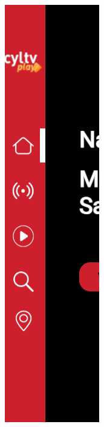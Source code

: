 \begin{figure}[H]
    \centering
    \begin{subfigure}[c]{0.1\textwidth} 
        \includegraphics[width=\textwidth]{imaxes/OTT/menu_lateral_cerrado.png}

\end{subfigure}
\end{figure}
